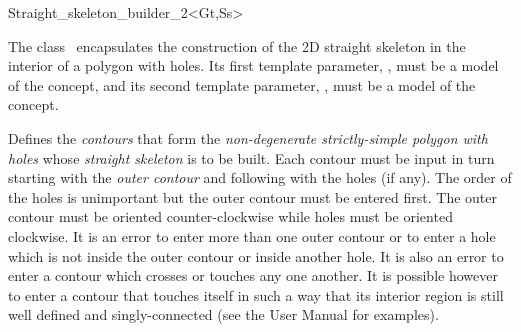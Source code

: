 

\begin{ccRefClass}{Straight_skeleton_builder_2<Gt,Ss>}

\ccDefinition
The class \ccRefName\  encapsulates the construction of the 2D straight skeleton in the interior of a polygon with holes. Its first template parameter, , must be a model of the  concept, and its second template parameter, , must be a model of the  concept.

 
\ccTypes
\ccGlue
\ccGlue

\ccCreation
{}


{Defines the \textit{contours} that form the \textit{non-degenerate strictly-simple polygon with holes} whose \textit{straight skeleton} is to be built. Each contour must be input in turn starting with the \textit{outer contour} and following with the holes (if any). The order of the holes is unimportant but the outer contour must be entered first. The outer contour must be oriented counter-clockwise while holes must be oriented clockwise. It is an error to enter more than one outer contour or to enter a hole which is not inside the outer contour or inside another hole. It is also an error to enter a contour which crosses or touches any one another. It is possible however to enter a contour that touches itself in such a way that its interior region is still well defined and singly-connected (see the User Manual for examples).

}
\end{ccRefClass}
